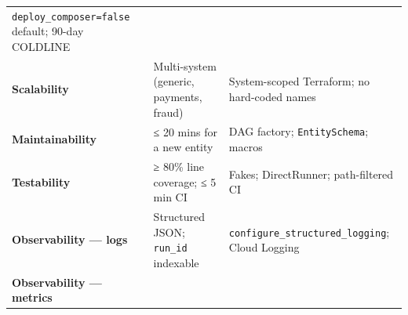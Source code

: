 \documentclass[
  11pt,
  british,
  oneside]{book}
\begin{document}
\begin{longtable}[]{@{}lll@{}}
\begin{minipage}[t]{0.30\columnwidth}
\texttt{deploy\_composer=false} default; 90-day COLDLINE\strut
\end{minipage}\tabularnewline
\begin{minipage}[t]{0.30\columnwidth}\raggedright
\textbf{Scalability}\strut
\end{minipage} & \begin{minipage}[t]{0.30\columnwidth}\raggedright
Multi-system (generic, payments, fraud)\strut
\end{minipage} & \begin{minipage}[t]{0.30\columnwidth}\raggedright
System-scoped Terraform; no hard-coded names\strut
\end{minipage}\tabularnewline
\begin{minipage}[t]{0.30\columnwidth}\raggedright
\textbf{Maintainability}\strut
\end{minipage} & \begin{minipage}[t]{0.30\columnwidth}\raggedright
≤ 20 mins for a new entity\strut
\end{minipage} & \begin{minipage}[t]{0.30\columnwidth}\raggedright
DAG factory; \texttt{EntitySchema}; macros\strut
\end{minipage}\tabularnewline
\begin{minipage}[t]{0.30\columnwidth}\raggedright
\textbf{Testability}\strut
\end{minipage} & \begin{minipage}[t]{0.30\columnwidth}\raggedright
≥ 80\% line coverage; ≤ 5 min CI\strut
\end{minipage} & \begin{minipage}[t]{0.30\columnwidth}\raggedright
Fakes; DirectRunner; path-filtered CI\strut
\end{minipage}\tabularnewline
\begin{minipage}[t]{0.30\columnwidth}\raggedright
\textbf{Observability --- logs}\strut
\end{minipage} & \begin{minipage}[t]{0.30\columnwidth}\raggedright
Structured JSON; \texttt{run\_id} indexable\strut
\end{minipage} & \begin{minipage}[t]{0.30\columnwidth}\raggedright
\texttt{configure\_structured\_logging}; Cloud Logging\strut
\end{minipage}\tabularnewline
\begin{minipage}[t]{0.30\columnwidth}\raggedright
\textbf{Observability --- metrics}\strut
\end{minipage} & \begin{minipage}[t]{0.30\columnwidth}\raggedright

\end{minipage}
\end{longtable}
\end{document}
